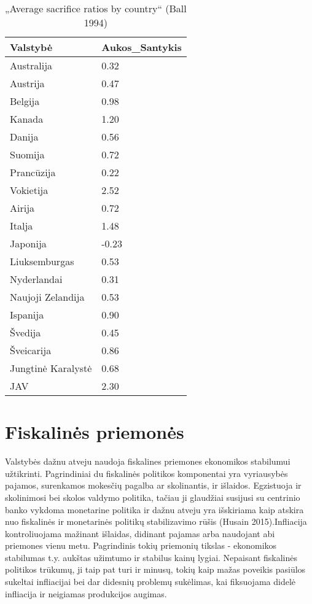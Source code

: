 \documentclass[
]{article}
\begin{document}
\begin{table}[H]

\caption{\label{tab:unnamed-chunk-2}„Average sacrifice ratios by country“ (Ball 1994)}
\centering
\begin{tabular}[t]{l|l}
\hline
Valstybė & Aukos\_Santykis\\
\hline
Australija & 0.32\\
\hline
Austrija & 0.47\\
\hline
Belgija & 0.98\\
\hline
Kanada & 1.20\\
\hline
Danija & 0.56\\
\hline
Suomija & 0.72\\
\hline
Prancūzija & 0.22\\
\hline
Vokietija & 2.52\\
\hline
Airija & 0.72\\
\hline
Italja & 1.48\\
\hline
Japonija & -0.23\\
\hline
Liuksemburgas & 0.53\\
\hline
Nyderlandai & 0.31\\
\hline
Naujoji Zelandija & 0.53\\
\hline
Ispanija & 0.90\\
\hline
Švedija & 0.45\\
\hline
Šveicarija & 0.86\\
\hline
Jungtinė Karalystė & 0.68\\
\hline
JAV & 2.30\\
\hline
\end{tabular}
\end{table}

\hypertarget{fiskalinux117s-priemonux117s}{%
\section{Fiskalinės priemonės}\label{fiskalinux117s-priemonux117s}}

Valstybės dažnu atveju naudoja fiskalines priemones ekonomikos
stabilumui užtikrinti. Pagrindiniai du fiskalinės politikos komponentai
yra vyriausybės pajamos, surenkamos mokesčių pagalba ar skolinantis, ir
išlaidos. Egzistuoja ir skolinimosi bei skolos valdymo politika, tačiau
ji glaudžiai susijusi su centrinio banko vykdoma monetarine politika ir
dažnu atveju yra išskiriama kaip atskira nuo fiskalinės ir monetarinės
politikų stabilizavimo rūšis (Husain 2015).Infliacija kontroliuojama
mažinant išlaidas, didinant pajamas arba naudojant abi priemones vienu
metu. Pagrindinis tokių priemonių tikslas - ekonomikos stabilumas t.y.
aukštas užimtumo ir stabilus kainų lygiai. Nepaisant fiskalinės
politikos trūkumų, ji taip pat turi ir minusų, tokių kaip mažas poveikis
pasiūlos sukeltai infliacijai bei dar didesnių problemų sukėlimas, kai
fiksuojama didelė infliacija ir neigiamas produkcijos augimas.
\end{document}
